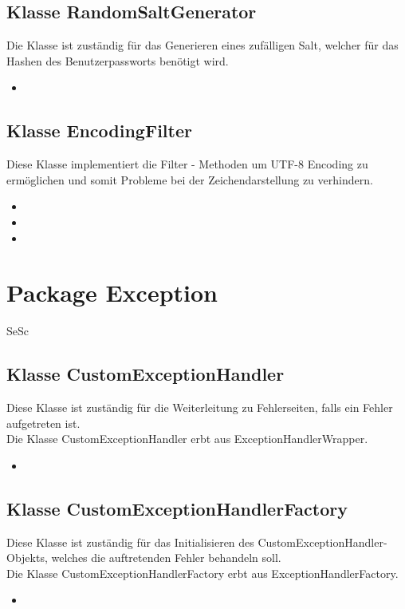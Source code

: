 	\subsection{Klasse RandomSaltGenerator}
	Die Klasse ist zuständig für das Generieren eines zufälligen Salt, welcher für das Hashen des Benutzerpassworts benötigt wird.
	\begin{itemize}
		\item {}
	\end{itemize} 
	
	\subsection{Klasse EncodingFilter}
	Diese Klasse implementiert die Filter - Methoden um UTF-8 Encoding zu
	ermöglichen und somit Probleme bei der Zeichendarstellung zu verhindern.
	\begin{itemize}
		\item \override
		\item \override
		\item \override
	\end{itemize}
	
	\section{Package Exception}
	\begin{tiny}
		SeSc
	\end{tiny}
	\subsection{Klasse CustomExceptionHandler}
	Diese Klasse ist zuständig für die Weiterleitung zu Fehlerseiten, falls ein Fehler aufgetreten
	ist. \\
	Die Klasse CustomExceptionHandler erbt aus ExceptionHandlerWrapper.
		\begin{itemize}
			\item \override
		\end{itemize}
		
	\subsection{Klasse CustomExceptionHandlerFactory}
	Diese Klasse ist zuständig für das  Initialisieren des CustomExceptionHandler-Objekts, welches die auftretenden Fehler behandeln soll.\\
	Die Klasse CustomExceptionHandlerFactory erbt aus ExceptionHandlerFactory.
	\begin{itemize}
		\item \override
	\end{itemize}
	
